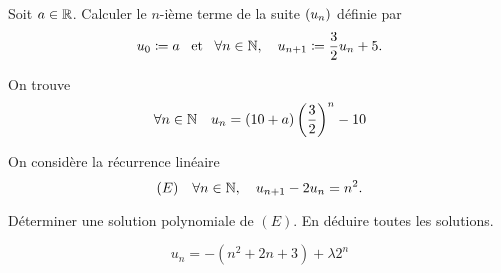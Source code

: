\documentclass{magnoliaold}
\begin{document}
\begin{exos}
  \exo Soit $a\in\mathbb{R}$. Calculer le $n$-ième terme de la suite $\left(u_n\right)$
    définie par
    \[u_0\coloneqq a \quad\!\text{et}\quad\! \forall n\in\mathbb{N} ,\quad u_{n+1}\coloneqq\frac{3}{2}u_n+5.\]
    \begin{sol}
    On trouve
    \[\forall n\in\mathbb{N} \quad u_n=\left(10+a\right)\left(\frac{3}{2}\right)^n-10\]
    \end{sol}
  \exo On considère la récurrence linéaire
    \[(E) \quad \forall n\in\mathbb{N},\quad u_{n+1}-2u_n=n^2.\]
    \begin{questions}
    \question Déterminer une solution polynomiale de $(E)$.
    \question En déduire toutes les solutions.
    \end{questions}
    \begin{sol}
  \[u_n=-(n^2+2n+3)+\lambda 2^n\]
    \end{sol}
  \end{exos}

\end{document}
